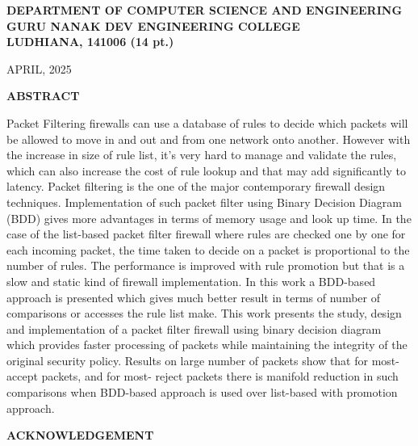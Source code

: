 \documentclass[12pt,a4paper]{report}
\begin{document}
\begin{titlepage}
    \vspace{1.5cm}
    
    {\fontsize{14pt}{18pt}\selectfont \bfseries
    DEPARTMENT OF COMPUTER SCIENCE AND ENGINEERING\\
    GURU NANAK DEV ENGINEERING COLLEGE\\
    LUDHIANA, 141006 {\fontsize{12pt}{14pt}\selectfont (14 pt.)} \par}
    
    \vspace{0.1cm}
    {\fontsize{12pt}{14pt}\selectfont APRIL, 2025 \par}
    
\end{titlepage}

\setlength{\footskip}{1.5cm}

\begin{center}
    {\fontsize{16pt}{18pt}\selectfont\textbf{ABSTRACT}}
\end{center}
\noindent
Packet Filtering firewalls can use a database of rules to decide which packets will be allowed to
move in and out and from one network onto another. However with the increase in size of rule
list, it’s very hard to manage and validate the rules, which can also increase the cost of rule lookup
and that may add significantly to latency. Packet filtering is the one of the major contemporary
firewall design techniques. Implementation of such packet filter using Binary Decision Diagram
(BDD) gives more advantages in terms of memory usage and look up time. In the case of the
list-based packet filter firewall where rules are checked one by one for each incoming packet,
the time taken to decide on a packet is proportional to the number of rules. The performance
is improved with rule promotion but that is a slow and static kind of firewall implementation.
In this work a BDD-based approach is presented which gives much better result in terms of
number of comparisons or accesses the rule list make. This work presents the study, design and
implementation of a packet filter firewall using binary decision diagram which provides faster
processing of packets while maintaining the integrity of the original security policy. Results on
large number of packets show that for most-accept packets, and for most- reject packets there is
manifold reduction in such comparisons when BDD-based approach is used over list-based with
promotion approach.

\newpage
\begin{center}
    {\fontsize{16pt}{18pt}\selectfont\textbf{ACKNOWLEDGEMENT}}
\end{center}
\end{document}
